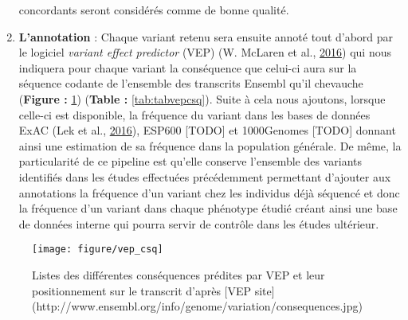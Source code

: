\documentclass[12pt,twoside]{reedthesis}
\theoremstyle{definition}
\theoremstyle{definition}
\theoremstyle{remark}
\begin{document}
\begin{enumerate}
    concordants seront considérés comme de bonne qualité.\\
  \item
    \textbf{L'annotation} : Chaque variant retenu sera ensuite annoté tout
    d'abord par le logiciel \emph{variant effect predictor} (VEP) (W.
    McLaren et al., \protect\hyperlink{ref-McLaren2016}{2016}) qui nous
    indiquera pour chaque variant la conséquence que celui-ci aura sur la
    séquence codante de l'ensemble des transcrits Ensembl qu'il chevauche
    (\textbf{Figure : }\ref{fig:figvepcsq}) (\textbf{Table :
    }\ref{tab:tabvepcsq}). Suite à cela nous ajoutons, lorsque celle-ci
    est disponible, la fréquence du variant dans les bases de données ExAC
    (Lek et al., \protect\hyperlink{ref-Lek2016}{2016}), ESP600 {[}TODO{]}
    et 1000Genomes {[}TODO{]} donnant ainsi une estimation de sa fréquence
    dans la population générale. De même, la particularité de ce pipeline
    est qu'elle conserve l'ensemble des variants identifiés dans les
    études effectuées précédemment permettant d'ajouter aux annotations la
    fréquence d'un variant chez les individus déjà séquencé et donc la
    fréquence d'un variant dans chaque phénotype étudié créant ainsi une
    base de données interne qui pourra servir de contrôle dans les études
    ultérieur.
  \end{enumerate}
  
  \begin{figure}
  
  {\centering \texttt{[image: figure/vep\_csq]} 
  
  }
  
  \caption[Listes des différentes conséquences prédites par VEP et leur positionnement sur le transcrit]{Listes des différentes conséquences prédites par VEP et leur positionnement sur le transcrit d'après [VEP site](http://www.ensembl.org/info/genome/variation/consequences.jpg)}\label{fig:figvepcsq}
  \end{figure}
  
\end{document}

